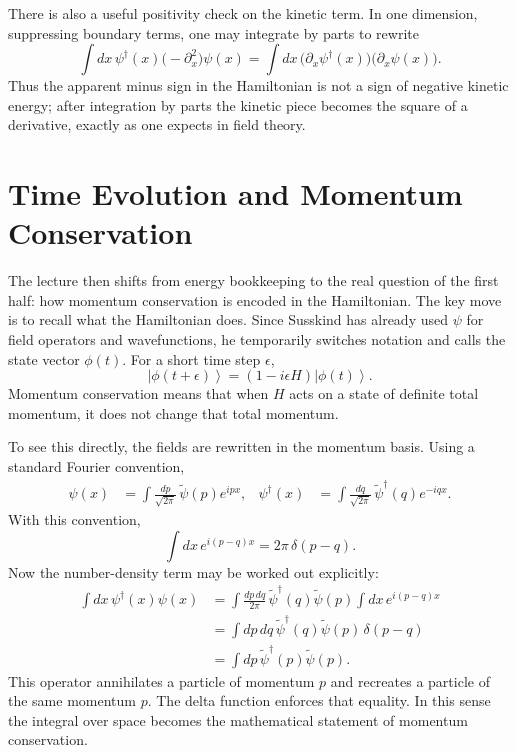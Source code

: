 There is also a useful positivity check on the kinetic term. In one dimension, suppressing boundary terms, one may integrate by parts to rewrite
\begin{equation}
\int dx\,\psi^\dagger(x)\bigl(-\partial_x^2\bigr)\psi(x)
=
\int dx\,\bigl(\partial_x\psi^\dagger(x)\bigr)\bigl(\partial_x\psi(x)\bigr).
\end{equation}
Thus the apparent minus sign in the Hamiltonian is not a sign of negative kinetic energy; after integration by parts the kinetic piece becomes the square of a derivative, exactly as one expects in field theory.

\section{Time Evolution and Momentum Conservation}

The lecture then shifts from energy bookkeeping to the real question of the first half: how momentum conservation is encoded in the Hamiltonian. The key move is to recall what the Hamiltonian does. Since Susskind has already used \(\psi\) for field operators and wavefunctions, he temporarily switches notation and calls the state vector \(\phi(t)\). For a short time step \(\epsilon\),
\begin{equation}
\left|\phi(t+\epsilon)\right\rangle
=
\left(1-i\epsilon H\right)\left|\phi(t)\right\rangle.
\end{equation}
Momentum conservation means that when \(H\) acts on a state of definite total momentum, it does not change that total momentum.

To see this directly, the fields are rewritten in the momentum basis. Using a standard Fourier convention,
\begin{align}
\psi(x)&=\int \frac{dp}{\sqrt{2\pi}}\,\tilde\psi(p)e^{ipx},
&
\psi^\dagger(x)&=\int \frac{dq}{\sqrt{2\pi}}\,\tilde\psi^\dagger(q)e^{-iqx}.
\end{align}
With this convention,
\begin{equation}
\int dx\,e^{i(p-q)x}=2\pi\,\delta(p-q).
\end{equation}
Now the number-density term may be worked out explicitly:
\begin{align}
\int dx\,\psi^\dagger(x)\psi(x)
&=
\int \frac{dp\,dq}{2\pi}\,
\tilde\psi^\dagger(q)\tilde\psi(p)
\int dx\,e^{i(p-q)x}
\\
&=
\int dp\,dq\,
\tilde\psi^\dagger(q)\tilde\psi(p)\,
\delta(p-q)
\\
&=
\int dp\,\tilde\psi^\dagger(p)\tilde\psi(p).
\end{align}
This operator annihilates a particle of momentum \(p\) and recreates a particle of the same momentum \(p\). The delta function enforces that equality. In this sense the integral over space becomes the mathematical statement of momentum conservation.

